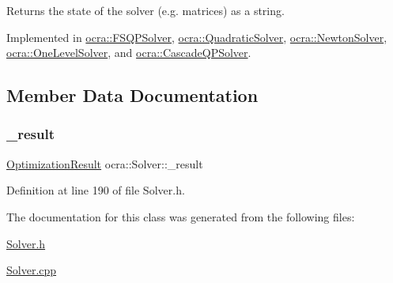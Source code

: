 Returns the state of the solver (e.\+g. matrices) as a string. 

Implemented in \hyperlink{classocra_1_1FSQPSolver_a3edc67c5c989d020ac8a77bf08946d14}{ocra\+::\+F\+S\+Q\+P\+Solver}, \hyperlink{classocra_1_1QuadraticSolver_a1f4efd162b95e7688d0720805fb94445}{ocra\+::\+Quadratic\+Solver}, \hyperlink{classocra_1_1NewtonSolver_a3d498cc7771cf3cf733552a35fd77006}{ocra\+::\+Newton\+Solver}, \hyperlink{classocra_1_1OneLevelSolver_a4d96beb846ca420bd1efcc96229f9d52}{ocra\+::\+One\+Level\+Solver}, and \hyperlink{classocra_1_1CascadeQPSolver_a411f14ee5770be6a3f04d665ac844e6c}{ocra\+::\+Cascade\+Q\+P\+Solver}.



\subsection{Member Data Documentation}
\hypertarget{classocra_1_1Solver_abe284a585b558a2c11a8b99cb7a410da}{}\label{classocra_1_1Solver_abe284a585b558a2c11a8b99cb7a410da} 
\subsubsection{\texorpdfstring{\+\_\+result}{\_result}}
{\footnotesize\ttfamily \hyperlink{structocra_1_1OptimizationResult}{Optimization\+Result} ocra\+::\+Solver\+::\+\_\+result\hspace{0.3cm}{\ttfamily [protected]}}



Definition at line 190 of file Solver.\+h.



The documentation for this class was generated from the following files\+:\begin{DoxyCompactItemize}
\item 
\hyperlink{Solver_8h}{Solver.\+h}\item 
\hyperlink{Solver_8cpp}{Solver.\+cpp}\end{DoxyCompactItemize}
